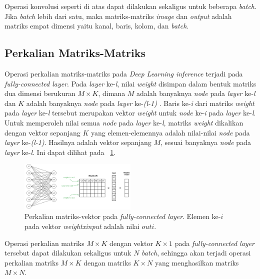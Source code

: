 Operasi konvolusi seperti di atas dapat dilakukan sekaligus untuk beberapa \textit{batch}. Jika \textit{batch} lebih dari satu, maka matriks-matriks \textit{image} dan \textit{output} adalah matriks empat dimensi yaitu kanal, baris, kolom, dan \textit{batch}. 

\subsection{Perkalian Matriks-Matriks}
Operasi perkalian matriks-matriks pada \textit{Deep Learning inference} terjadi pada \textit{fully-connected layer}. Pada \textit{layer} ke-\textit{l}, nilai \textit{weight} disimpan dalam bentuk matriks dua dimensi berukuran $M \times K$, dimana $M$ adalah banyaknya \textit{node} pada \textit{layer} ke-\textit{l} dan $K$ adalah banyaknya \textit{node} pada \textit{layer} ke-\textit{(l-1)} \cite{deeplearningmatrix}. Baris ke-\textit{i} dari matriks \textit{weight} pada \textit{layer} ke-\textit{l} tersebut merupakan vektor \textit{weight} untuk \textit{node} ke-\textit{i} pada \textit{layer} ke-\textit{l}. Untuk memperoleh nilai semua \textit{node} pada \textit{layer} ke-\textit{l}, matriks \textit{weight} dikalikan dengan vektor sepanjang $K$ yang elemen-elemennya adalah nilai-nilai \textit{node} pada \textit{layer} ke-\textit{(l-1)}. Hasilnya adalah vektor sepanjang $M$, sesuai banyaknya \textit{node} pada \textit{layer} ke-\textit{l}. Ini dapat dilihat pada \pic~\ref{fig:fcmatmul}. 

\begin{figure}
	\centering
	\includegraphics[width=0.50\textwidth]
	{pics/fcmatmul.png}
	\caption{Perkalian matriks-vektor pada \textit{fully-connected layer}. Elemen ke-$i$ pada vektor \textit{weightxinput} adalah nilai $outi$.}
	\label{fig:fcmatmul}
\end{figure}

Operasi perkalian matriks $M \times K$ dengan vektor $K \times 1$ pada \textit{fully-connected layer} tersebut dapat dilakukan sekaligus untuk $N$ \textit{batch}, sehingga akan terjadi operasi perkalian matriks $M \times K$ dengan matriks $K \times N$ yang menghasilkan matriks $M \times N$.

